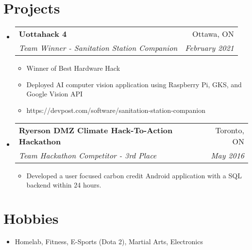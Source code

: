 \documentclass[letterpaper,11pt]{article}
\makeatletter
\newcommand{\resumeItem}[2]{
  \item\small{
    \textbf{#1}{#2 \vspace{-2pt}}
  }
}
\newcommand{\resumeSubheading}[4]{
  \vspace{-1pt}\item
    \begin{tabular*}{0.97\textwidth}[t]{l@{\extracolsep{\fill}}r}
      \textbf{#1} & #2 \\
      \textit{\small#3} & \textit{\small #4} \\
    \end{tabular*}\vspace{-5pt}
}
\newcommand{\resumeSubHeadingListStart}{\begin{itemize}[leftmargin=*]}
\newcommand{\resumeSubHeadingListEnd}{\end{itemize}}
\newcommand{\resumeItemListStart}{\begin{itemize}}
\newcommand{\resumeItemListEnd}{\end{itemize}\vspace{-5pt}}
\makeatother
\begin{document}
\section{Projects}
  \resumeSubHeadingListStart
	\resumeSubheading
	{Uottahack 4}{Ottawa, ON}
	{Team Winner - Sanitation Station Companion}{February 2021}
		\resumeItemListStart
      \resumeItem{}
      {Winner of Best Hardware Hack}
      \resumeItem{}
      {Deployed AI computer vision application using Raspberry Pi, GKS, and Google Vision API}
      \resumeItem{}
			{https://devpost.com/software/sanitation-station-companion}
		\resumeItemListEnd
\resumeSubheading
	{Ryerson DMZ Climate Hack-To-Action Hackathon}{Toronto, ON}
	{Team Hackathon Competitor - 3rd Place }{May 2016}
		\resumeItemListStart
			\resumeItem{}
			{Developed a user focused carbon credit Android application with a SQL backend within 24 hours.}
		\resumeItemListEnd
    
  \resumeSubHeadingListEnd

\section{Hobbies}
	\resumeSubHeadingListStart
	\item{
	\textbf{}{Homelab, Fitness, E-Sports (Dota 2), Martial Arts, Electronics}
	}
	\resumeSubHeadingListEnd
  
\end{document}
